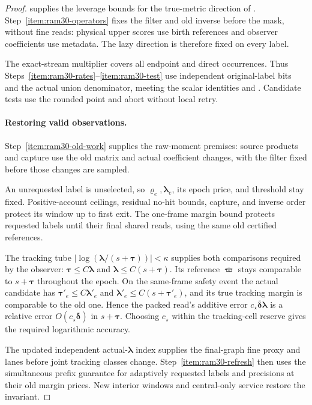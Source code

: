 \documentclass[11pt]{article}
\theoremstyle{remark}
\newcommand{\llambda}{\boldsymbol{\lambda}}
\newcommand{\ttau}{\boldsymbol{\tau}}
\newcommand{\vvr}{\boldsymbol{\varrho}}
\newcommand{\vvpbar}{\overline{\boldsymbol{\varpi}}}
\newcommand{\ddeltabar}{\overline{\boldsymbol{\delta}}}
\begin{document}
\begin{proof}
 supplies the leverage bounds for the true-metric
direction of .
Step~\ref{item:ram30-operators} fixes the filter and old inverse before the
mask, without fine reads: physical upper scores use birth references and
observer coefficients use metadata.
The lazy direction is therefore fixed on every label.

The exact-stream multiplier covers all endpoint and direct occurrences.
Thus Steps~\ref{item:ram30-rates}--\ref{item:ram30-test} use independent
original-label bits and the actual union denominator, meeting the scalar
identities and .
Candidate tests use the rounded point and abort without local retry.

\paragraph{Restoring valid observations.}
Step~\ref{item:ram30-old-work} supplies the raw-moment premises: source products
and capture use the old matrix and actual coefficient changes, with the filter
fixed before those changes are sampled.

An unrequested label is unselected, so $\vvr_e,\llambda_e$, its epoch price, and
threshold stay fixed.
Positive-account ceilings, residual no-hit bounds, capture, and inverse order
protect its window up to first exit.
The one-frame margin bound protects requested labels until their final shared
reads, using the same old certified references.

The tracking tube $|\log(\llambda/(s+\ttau))|<\kappa$ supplies both comparisons
required by the observer: $\ttau\le C\llambda$ and $\llambda\le C(s+\ttau)$.
Its reference $\vvpbar$ stays comparable to $s+\ttau$ throughout the epoch.
On the same-frame safety event the actual candidate has $\ttau'_e\le C\llambda'_e$
and $\llambda'_e\le C(s+\ttau'_e)$, and its true tracking margin is comparable to
the old one.
Hence the packed read's additive error $c_\star\ddeltabar\llambda$ is a relative error
$O(c_\star\ddeltabar)$ in $s+\ttau$.
Choosing $c_\star$ within the tracking-cell reserve gives the required logarithmic
accuracy.

The updated independent actual-$\llambda$ index supplies the final-graph fine
proxy and lanes before joint tracking classes change.
Step~\ref{item:ram30-refresh} then uses the simultaneous prefix guarantee for
adaptively requested labels and precisions at their old margin prices.
New interior windows and central-only service restore the invariant.


\end{proof}
\end{document}
